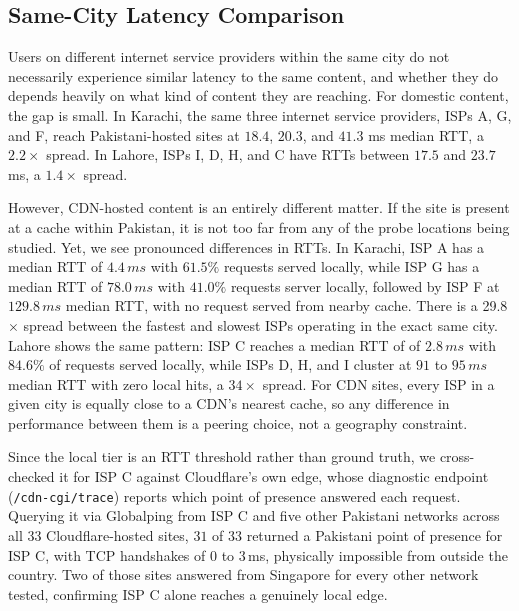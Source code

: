 \documentclass[sigconf,anonymous,10pt]{acmart}
\begin{document}

\subsection{Same-City Latency Comparison}
\label{sec:rq2}

Users on different internet service providers within the same city do not necessarily experience similar latency to the same content, and whether they do depends heavily on what kind of content they are reaching. For domestic content, the gap is small. In Karachi, the same three internet service providers, ISPs A, G, and F, reach Pakistani-hosted sites at $18.4$, $20.3$, and $41.3$ ms median RTT, a $2.2\times$ spread. In Lahore, ISPs I, D, H, and C have RTTs between $17.5$ and $23.7$ ms, a $1.4\times$ spread.

However, CDN-hosted content is an entirely different matter. If the site is present at a cache within Pakistan, it is not too far from any of the probe locations being studied. Yet, we see pronounced differences in RTTs. In Karachi, ISP A has a median RTT of $4.4\,ms$ with $61.5\%$ requests served locally, while ISP G has a median RTT of $78.0\,ms$ with $41.0\%$ requests server locally, followed by ISP F at $129.8\,ms$ median RTT, with no request served from nearby cache. There is a 29.8$\times$ spread between the fastest and slowest ISPs operating in the exact same city. Lahore shows the same pattern: ISP C reaches a median RTT of of $2.8\,ms$ with $84.6\%$ of requests served locally, while ISPs D, H, and I cluster at $91$ to $95\,ms$ median RTT with zero local hits, a $34\times$ spread. For CDN sites, every ISP in a given city is equally close to a CDN's nearest cache, so any difference in performance between them is a peering choice, not a geography constraint. 

Since the local tier is an RTT threshold rather than ground truth, we cross-checked it for ISP C against Cloudflare's own edge, whose diagnostic endpoint (\texttt{/cdn-cgi/trace}) reports which point of presence answered each request. Querying it via Globalping from ISP C and five other Pakistani networks across all $33$ Cloudflare-hosted sites, $31$ of $33$ returned a Pakistani point of presence for ISP C, with TCP handshakes of 0 to $3$\,ms, physically impossible from outside the country. Two of those sites answered from Singapore for every other network tested, confirming ISP C alone reaches a genuinely local edge.
\end{document}
